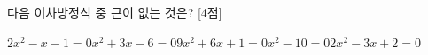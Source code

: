 다음 이차방정식 중 근이 없는 것은? \mbox{[4점]}
\begin{choicesii}{$2x^2-x-1=0$}{$x^2+3x-6=0$}{$9x^2+6x+1=0$}{$x^2-10=0$}{$2x^2-3x+2=0$}\end{choicesii}
